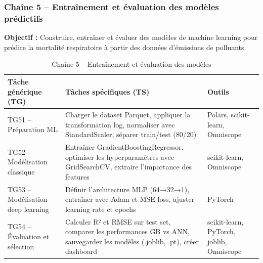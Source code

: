 \documentclass[11pt,a4paper]{article}
\begin{document}
\subsubsection{Chaîne 5 -- Entraînement et évaluation des modèles prédictifs}

\textbf{Objectif :} Construire, entraîner et évaluer des modèles de machine learning pour prédire la mortalité respiratoire à partir des données d'émissions de polluants.

\begin{table}[H]
\centering
\caption{Chaîne 5 -- Entraînement et évaluation des modèles}
\begin{tabular}{p{3.5cm}p{5.5cm}p{4.5cm}}
\toprule
\textbf{Tâche générique (TG)} & \textbf{Tâches spécifiques (TS)} & \textbf{Outils} \\
\midrule
TG51 -- Préparation ML & Charger le dataset Parquet, appliquer la transformation log, normaliser avec StandardScaler, séparer train/test (80/20) & Polars, scikit-learn, Omniscope \\
\midrule
TG52 -- Modélisation classique & Entraîner GradientBoostingRegressor, optimiser les hyperparamètres avec GridSearchCV, extraire l'importance des features & scikit-learn, Omniscope \\
\midrule
TG53 -- Modélisation deep learning & Définir l'architecture MLP (64→32→1), entraîner avec Adam et MSE loss, ajuster learning rate et epochs & PyTorch \\
\midrule
TG54 -- Évaluation et sélection & Calculer R² et RMSE sur test set, comparer les performances GB vs ANN, sauvegarder les modèles (.joblib, .pt), créer dashboard & scikit-learn, PyTorch, joblib, Omniscope \\
\bottomrule
\end{tabular}
\end{table}
\end{document}
